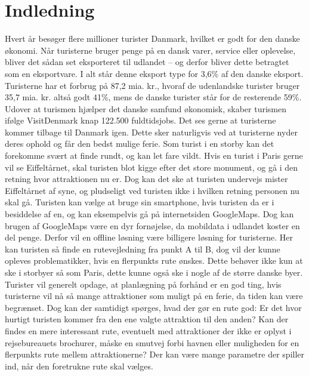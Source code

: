 \chapter{Indledning}

Hvert år besøger flere millioner turister Danmark, hvilket er godt for den danske økonomi. Når turisterne bruger penge på en dansk varer, service eller oplevelse, bliver det sådan set eksporteret til udlandet – og derfor bliver dette betragtet som en eksportvare. I alt står denne eksport type for 3,6\% af den danske eksport. Turisterne har et forbrug på 87,2 mia. kr., hvoraf de udenlandske turister bruger 35,7 mia. kr. altså godt 41\%, mens de danske turister står for de resterende 59\%. Udover at turismen hjælper det danske samfund økonomisk, skaber turismen ifølge VisitDenmark knap 122.500 fuldtidsjobs. \citep{faktaogtalVD}   \newline
Det ses gerne at turisterne kommer tilbage til Danmark igen. Dette sker naturligvis ved at turisterne nyder deres ophold og får den bedst mulige ferie. Som turist i en storby kan det forekomme svært at finde rundt, og kan let fare vildt. Hvis en turist i Paris gerne vil se Eiffeltårnet, skal turisten blot kigge efter det store monument, og gå i den retning hvor attraktionen nu er. Dog kan det ske at turisten undervejs mister Eiffeltårnet af syne, og pludseligt ved turisten ikke i hvilken retning personen nu skal gå. Turisten kan vælge at bruge sin smartphone, hvis turisten da er i besiddelse af en, og kan eksempelvis gå på internetsiden GoogleMaps. Dog kan brugen af GoogleMaps være en dyr fornøjelse, da mobildata i udlandet koster en del penge. Derfor vil en offline løsning være billigere løsning for turisterne. Her kan turisten så finde en rutevejledning fra punkt A til B, dog vil der kunne opleves problematikker, hvis en flerpunkts rute ønskes. Dette behøver ikke kun at ske i storbyer så som Paris, dette kunne også ske i nogle af de større danske byer. \newline
Turister vil generelt opdage, at planlægning på forhånd er en god ting, hvis turisterne vil nå så mange attraktioner som muligt på en ferie, da tiden kan være begrænset. Dog kan der samtidigt spørges, hvad der gør en rute god: Er det hvor hurtigt turisten kommer fra den ene valgte attraktion til den anden? Kan der findes en mere interessant rute, eventuelt med attraktioner der ikke er oplyst i rejsebureauets brochurer, måske en smutvej forbi havnen eller muligheden for en flerpunkts rute mellem attraktionerne? Der kan være mange parametre der spiller ind, når den foretrukne rute skal vælges. \newline
